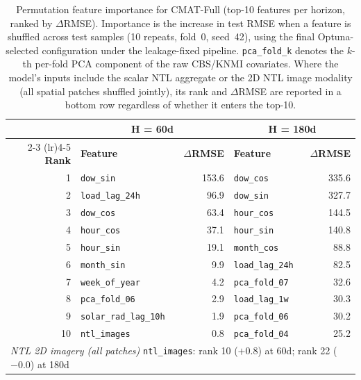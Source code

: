 \begin{table}[h]
\centering
\scriptsize
\caption{Permutation feature importance for CMAT-Full (top-10
features per horizon, ranked by $\Delta$RMSE). Importance is the increase in
test RMSE when a feature is shuffled across test samples (10 repeats, fold~0,
seed~42), using the final Optuna-selected configuration under the
leakage-fixed pipeline. \texttt{pca\_fold\_k} denotes the $k$-th per-fold PCA
component of the raw CBS/KNMI covariates. Where the model's inputs include the scalar NTL aggregate or the 2D NTL image modality (all spatial patches shuffled jointly), its rank and $\Delta$RMSE are reported in a bottom row regardless of whether it enters the top-10.}
\label{tab:feat_imp_full}
\begin{tabular}{r l r l r }
\toprule
 & \multicolumn{2}{c}{\textbf{H = 60d}} & \multicolumn{2}{c}{\textbf{H = 180d}} \\
\cmidrule(lr){2-3} \cmidrule(lr){4-5}
\textbf{Rank} & \textbf{Feature} & \textbf{$\Delta$RMSE} & \textbf{Feature} & \textbf{$\Delta$RMSE} \\
\midrule
1 & \texttt{dow\_sin} & 153.6 & \texttt{dow\_cos} & 335.6 \\
2 & \texttt{load\_lag\_24h} & 96.9 & \texttt{dow\_sin} & 327.7 \\
3 & \texttt{dow\_cos} & 63.4 & \texttt{hour\_cos} & 144.5 \\
4 & \texttt{hour\_cos} & 37.1 & \texttt{hour\_sin} & 140.8 \\
5 & \texttt{hour\_sin} & 19.1 & \texttt{month\_cos} & 88.8 \\
6 & \texttt{month\_sin} & 9.9 & \texttt{load\_lag\_24h} & 82.5 \\
7 & \texttt{week\_of\_year} & 4.2 & \texttt{pca\_fold\_07} & 32.6 \\
8 & \texttt{pca\_fold\_06} & 2.9 & \texttt{load\_lag\_1w} & 30.3 \\
9 & \texttt{solar\_rad\_lag\_10h} & 1.9 & \texttt{pca\_fold\_06} & 30.2 \\
10 & \texttt{ntl\_images} & 0.8 & \texttt{pca\_fold\_04} & 25.2 \\
\midrule
\multicolumn{5}{l}{\textit{NTL 2D imagery (all patches)} \texttt{ntl\_images}: rank 10 (${+}0.8$) at 60d;\; rank 22 (${-}0.0$) at 180d} \\
\bottomrule
\end{tabular}
\end{table}

\clearpage
